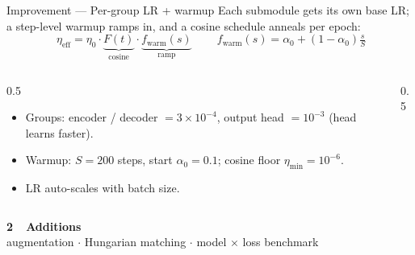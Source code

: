 \documentclass[aspectratio=169,10pt]{beamer}
\begin{document}
\begin{frame}{Improvement --- Per-group LR + warmup}
  \small
  Each submodule gets its own base LR; a step-level warmup ramps in, and a cosine
  schedule anneals per epoch:
  \[
    \boxed{\ \eta_\text{eff}=\eta_0\cdot \underbrace{F(t)}_{\text{cosine}}\cdot
      \underbrace{f_\text{warm}(s)}_{\text{ramp}}\ }\qquad
    f_\text{warm}(s)=\alpha_0+(1-\alpha_0)\tfrac{s}{S}
  \]
  \begin{columns}[T]
    \begin{column}{0.5\textwidth}
      \begin{itemize}\scriptsize
        \item Groups: encoder / decoder $=3\!\times\!10^{-4}$, output head $=10^{-3}$ (head learns faster).
        \item Warmup: $S=200$ steps, start $\alpha_0=0.1$; cosine floor $\eta_{\min}=10^{-6}$.
        \item LR auto-scales with batch size.
      \end{itemize}
    \end{column}
    \begin{column}{0.5\textwidth}
      \centering
    \end{column}
  \end{columns}
\end{frame}

\begin{frame}[plain]
  \centering \vfill
  {\Large\bfseries\color{accent} 2\ \ Additions}\\[4pt]
  {\small augmentation \; $\cdot$ \; Hungarian matching \; $\cdot$ \; model $\times$ loss benchmark}
  \vfill
\end{frame}
\end{document}
